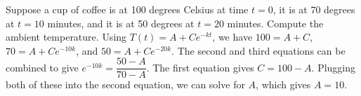 {Suppose a cup of coffee is at 100 degrees Celsius at time $t=0$,
it is at 70 degrees at $t=10$ minutes, and it is at 50 degrees at $t=20$
minutes.  Compute the ambient temperature.}
{Using $T(t)=A+Ce^{-kt}$, we have $100=A+C$, $70=A+Ce^{-10k}$, and $50 = A+Ce^{-20k}$. The second and third equations can be combined to give $e^{-10k}=\dfrac{50-A}{70-A}$. The first equation gives $C=100-A$. Plugging both of these into the second equation, we can solve for $A$, which gives $A=10$.}